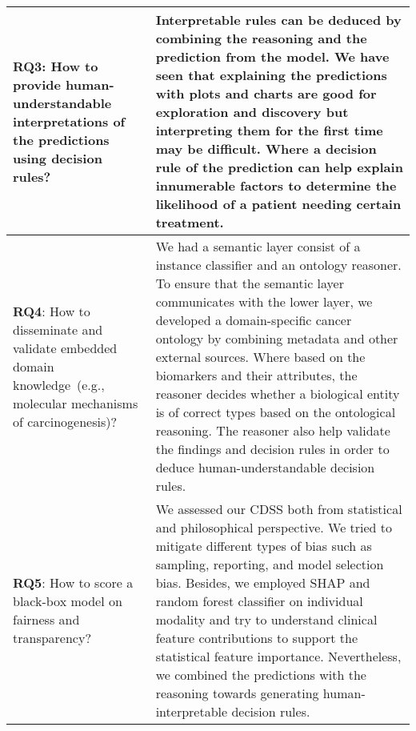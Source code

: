 \begin{table}[h!]
{\begin{tabular}{|p{4.8cm}|p{10cm}|}
         \hline
         \begin{flushleft}\textbf{RQ3}: How to provide human-understandable interpretations of the predictions using decision rules?\end{flushleft} & Interpretable rules can be deduced by combining the reasoning and the prediction from the model. We have seen that explaining the predictions with plots and charts are good for exploration and discovery but interpreting them for the first time may be difficult. Where a decision rule of the prediction can help explain innumerable factors to determine the likelihood of a patient needing certain treatment. \\ 
         \hline
         \begin{flushleft}\textbf{RQ4}: How to disseminate and validate embedded domain knowledge~(e.g., molecular mechanisms of carcinogenesis)? \end{flushleft}& We had a semantic layer consist of a instance classifier and an ontology reasoner. To ensure that the semantic layer communicates with the lower layer, we developed a domain-specific cancer ontology by combining metadata and other external sources. Where based on the biomarkers and their attributes, the reasoner decides whether a biological entity is of correct types based on the ontological reasoning. The reasoner also help validate the findings and decision rules in order to deduce human-understandable decision rules.\\ 
         \hline
         \begin{flushleft}\textbf{RQ5}: How to score a black-box model on fairness and transparency?\end{flushleft} & We assessed our CDSS both from statistical and philosophical perspective. We tried to mitigate different types of bias such as sampling, reporting, and model selection bias. Besides, we employed SHAP and random forest classifier on individual modality and try to understand clinical feature contributions to support the statistical feature importance. Nevertheless, we combined the predictions with the reasoning towards generating human-interpretable decision rules.\\ 
         \hline
    \end{tabular}}
\end{table}
    
